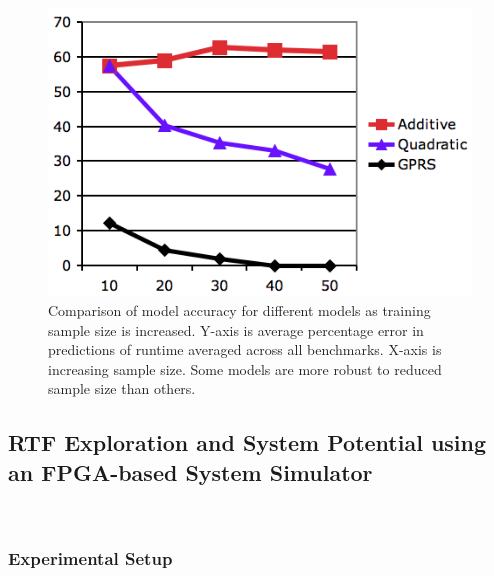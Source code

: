 \begin{figure}
	\centering
	\includegraphics[scale = 0.5] {Figures/acc_sample.png}
	\caption{ \small Comparison of model accuracy for different models as training sample size is increased.  Y-axis is average percentage error in predictions of runtime averaged across all benchmarks. X-axis is increasing sample size.  Some models are more robust to reduced sample size than others.}
	\label{fig:acc-sample}
\end{figure}


\subsection{RTF Exploration and System Potential using an FPGA-based System Simulator}
~\cite{bird,tess_resource}



\subsubsection*{Experimental Setup}

